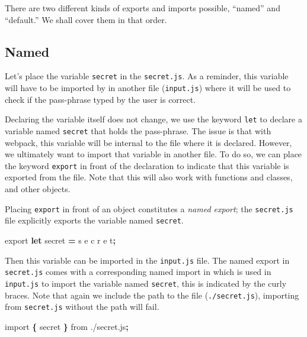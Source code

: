 \documentclass[
  10pt,
]{krantz}
\makeatletter
\newenvironment{Shaded}{\begin{snugshade}}{\end{snugshade}}
\newcommand{\ImportTok}[1]{#1}
\newcommand{\KeywordTok}[1]{\textcolor[rgb]{0.27,0.27,0.27}{\textbf{#1}}}
\newcommand{\NormalTok}[1]{#1}
\newcommand{\OperatorTok}[1]{\textcolor[rgb]{0.43,0.43,0.43}{\textbf{#1}}}
\newcommand{\StringTok}[1]{\textcolor[rgb]{0.5,0.5,0.5}{#1}}
\newenvironment{kframe}{%
\medskip{}
\setlength{\fboxsep}{.8em}
 \def\at@end@of@kframe{}%
 \ifinner\ifhmode%
  \def\at@end@of@kframe{\end{minipage}}%
  \begin{minipage}{\columnwidth}%
 \fi\fi%
 \def\FrameCommand##1{\hskip\@totalleftmargin \hskip-\fboxsep
 \colorbox{shadecolor}{##1}\hskip-\fboxsep
     \hskip-\linewidth \hskip-\@totalleftmargin \hskip\columnwidth}%
 \MakeFramed {\advance\hsize-\width
   \@totalleftmargin\z@ \linewidth\hsize
   \@setminipage}}%
 {\par\unskip\endMakeFramed%
 \at@end@of@kframe}
\renewenvironment{Shaded}{\begin{kframe}}{\end{kframe}}
\makeatother
\begin{document}
There are two different kinds of exports and imports possible, ``named'' and ``default.'' We shall cover them in that order.

\hypertarget{webpack-intro-import-export-named}{%
\subsection{Named}\label{webpack-intro-import-export-named}}

Let's place the variable \texttt{secret} in the \texttt{secret.js}. As a reminder, this variable will have to be imported by in another file (\texttt{input.js}) where it will be used to check if the pass-phrase typed by the user is correct.

Declaring the variable itself does not change, we use the keyword \texttt{let} to declare a variable named \texttt{secret} that holds the pass-phrase. The issue is that with webpack, this variable will be internal to the file where it is declared. However, we ultimately want to import that variable in another file. To do so, we can place the keyword \texttt{export} in front of the declaration to indicate that this variable is exported from the file. Note that this will also work with functions and classes, and other objects.

Placing \texttt{export} in front of an object constitutes a \emph{named export}; the \texttt{secret.js} file explicitly exports the variable named \texttt{secret}.

\begin{Shaded}
\begin{Highlighting}[]
\ImportTok{export} \KeywordTok{let}\NormalTok{ secret }\OperatorTok{=} \StringTok{\textquotesingle{}s e c r e t\textquotesingle{}}\OperatorTok{;}
\end{Highlighting}
\end{Shaded}

Then this variable can be imported in the \texttt{input.js} file. The named export in \texttt{secret.js} comes with a corresponding named import in which is used in \texttt{input.js} to import the variable named \texttt{secret}, this is indicated by the curly braces. Note that again we include the path to the file (\texttt{./secret.js}), importing from \texttt{secret.js} without the path will fail.

\begin{Shaded}
\begin{Highlighting}[]
\ImportTok{import} \OperatorTok{\{}\NormalTok{ secret }\OperatorTok{\}} \ImportTok{from} \StringTok{\textquotesingle{}./secret.js\textquotesingle{}}\OperatorTok{;}
\end{Highlighting}
\end{Shaded}
\end{document}
